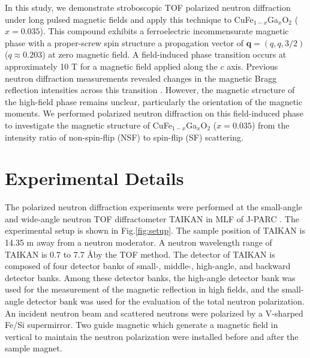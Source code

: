 \documentclass[%
 reprint,
superscriptaddress,
 amsmath,amssymb,
 aps,
floatfix,
]{revtex4-2}
\newcommand{\cufegao}{CuFe$_{1-x}$Ga$_{x}$O$_{2}$ ($x$ = 0.035)}
\begin{document}
In this study, we demonstrate stroboscopic TOF polarized neutron diffraction under long pulsed magnetic fields and apply this technique to CuFe$_{1-x}$Ga$_x$O$_2$ ($x=0.035$).
This compound exhibits a ferroelectric incommensurate magnetic phase with a proper-screw spin structure a propagation vector of $\mathbf{q}=(q,q,3/2)$ ($q \approx 0.203$) at zero magnetic field.
A field-induced phase transition occurs at approximately 10 T for a magnetic field applied along the $c$ axis.
Previous neutron diffraction measurements revealed changes in the magnetic Bragg reflection intensities across this transition \cite{nakajima_stroboscopic_2024}.
However, the magnetic structure of the high-field phase remains unclear, particularly the orientation of the magnetic moments.
We performed polarized neutron diffraction on this field-induced phase to investigate the magnetic structure of CuFe$_{1-x}$Ga$_x$O$_2$ ($x=0.035$) from the intensity ratio of non-spin-flip (NSF) to spin-flip (SF) scattering.


\section{Experimental Details}


The polarized neutron diffraction experiments were performed at the small-angle and wide-angle neutron TOF diffractometer TAIKAN in MLF of J-PARC \cite{takata_design_2015}.
The experimental setup is shown in Fig.\ref{fig:setup}.
The sample position of TAIKAN is 14.35 m away from a neutron moderator.
A neutron wavelength range of TAIKAN is 0.7 to 7.7 \AA by the TOF method.
The detector of TAIKAN is composed of four detector banks of small-, middle-, high-angle, and backward detector banks.
Among these detector banks, the high-angle detector bank was used for the measurement of the magnetic reflection in high fields, and the small-angle detector bank was used for the evaluation of the total neutron polarization.
An incident neutron beam and scattered neutrons were polarized by a V-sharped Fe/Si supermirror.
Two guide magnetic which generate a magnetic field in vertical to maintain the neutron polarization were installed before and after the sample magnet.
\end{document}
